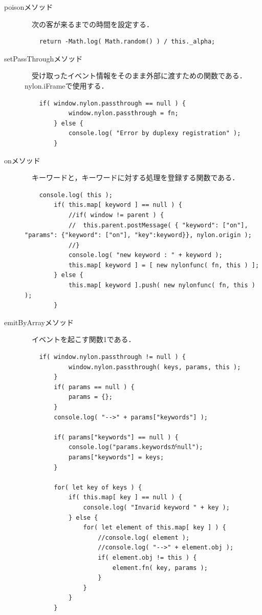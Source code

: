 \documentclass[12pt,a4j]{ltjsarticle}
\begin{document}
\begin{description}
\item[poisonメソッド]　次の客が来るまでの時間を設定する．
\begin{lstlisting}
	return -Math.log( Math.random() ) / this._alpha; 
\end{lstlisting} 
\vspace{10mm}

\item[setPassThroughメソッド]　受け取ったイベント情報をそのまま外部に渡すための関数である． nylon.iFrameで使用する．
\begin{lstlisting}
	if( window.nylon.passthrough == null ) {
			window.nylon.passthrough = fn;
		} else {
			console.log( "Error by duplexy registration" );
		} 
\end{lstlisting} 
\vspace{10mm}

\item[onメソッド]　キーワードと，キーワードに対する処理を登録する関数である． 
\begin{lstlisting}
	console.log( this );
		if( this.map[ keyword ] == null ) {
			//if( window != parent ) {
			//	this.parent.postMessage( { "keyword": ["on"], "params": {"keyword": ["on"], "key":keyword}}, nylon.origin );
			//}
			console.log( "new keyword : " + keyword );
			this.map[ keyword ] = [ new nylonfunc( fn, this ) ];
		} else {
			this.map[ keyword ].push( new nylonfunc( fn, this ) );
		}
\end{lstlisting} 
\vspace{10mm}

\item[emitByArrayメソッド]　イベントを起こす関数1である． 
\begin{lstlisting}
	if( window.nylon.passthrough != null ) {
			window.nylon.passthrough( keys, params, this );
		}
		if( params == null ) {
			params = {};
		}
		console.log( "-->" + params["keywords"] );

		if( params["keywords"] == null ) {
			console.log("params.keywordsがnull");
			params["keywords"] = keys;
		}

		for( let key of keys ) {
			if( this.map[ key ] == null ) {
				console.log( "Invarid keyword " + key );
			} else {
				for( let element of this.map[ key ] ) {
					//console.log( element );
					//console.log( "-->" + element.obj );
					if( element.obj != this ) {
						element.fn( key, params );
					}
				}
			}
		}
\end{lstlisting} 
\vspace{10mm}


\end{description}
\end{document}
